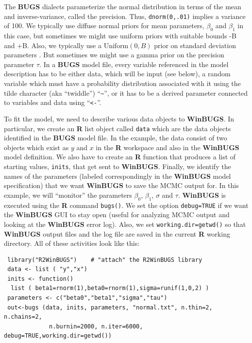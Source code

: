 The {\bf BUGS} dialects parameterize the normal 
distribution in
terms of the mean and inverse-variance, called the precision. Thus,
\mbox{\tt dnorm(0,.01)} implies a variance of 100.
We typically use diffuse normal priors for mean parameters, $\beta_0$ and $\beta_1$ in this case, but sometimes we might use uniform priors with suitable bounds -B and +B.
Also, we typically use a $\text{Uniform}(0,B)$ prior on standard
deviation parameters
\citep{gelman:2006}.
But sometimes we might use a gamma prior on the precision parameter $\tau$.
In a {\bf BUGS} model file, every variable referenced in
the model description has to be
either data, which will be input (see below), a random variable which
must have a probability distribution associated with it using the
tilde character (aka ``twiddle'') ``\verb#~#'', or it has to be a derived parameter connected to variables and
data using ``\mbox{\tt <-}''.


To fit the model, we need to describe various data objects to {\bf
  WinBUGS}. In particular,
we create an {\bf R} list object called \mbox{\tt data} which
are the data objects identified in the {\bf BUGS} model file.
 In the example, the
data consist of two objects which exist as $y$ and $x$ in the {\bf R}
workspace and also in the {\bf WinBUGS} model definition.
 We also have to create an {\bf R} function
that produces a list of starting values, \mbox{\tt inits}, that get sent to
{\bf WinBUGS}.
 Finally, we identify
the names of the parameters (labeled correspondingly in the {\bf WinBUGS}
model specification) that we want {\bf WinBUGS} to save the MCMC output
for. In this example, we will ``monitor'' the parameters
$\beta_0$, $\beta_1$, $\sigma$ and $\tau$.
{\bf WinBUGS} is executed using the {\bf R} command
\mbox{\tt bugs()}.
We set the option \mbox{\tt debug=TRUE} if we want the {\bf WinBUGS}
GUI to stay open (useful for analyzing MCMC output and looking at the
{\bf WinBUGS} error log). Also, we set \mbox{\tt working.dir=getwd()}
so that {\bf WinBUGS} output files and the log file are saved in the
current {\bf R} working directory.
  All of these activities look like this:
{\small
\begin{verbatim}
 library("R2WinBUGS")    # "attach" the R2WinBUGS library
 data <- list ( "y","x")
 inits <- function()
  list ( beta1=rnorm(1),beta0=rnorm(1),sigma=runif(1,0,2) )
 parameters <- c("beta0","beta1","sigma","tau")
 out<-bugs (data, inits, parameters, "normal.txt", n.thin=2, n.chains=2,
             n.burnin=2000, n.iter=6000, debug=TRUE,working.dir=getwd())
\end{verbatim}
}

